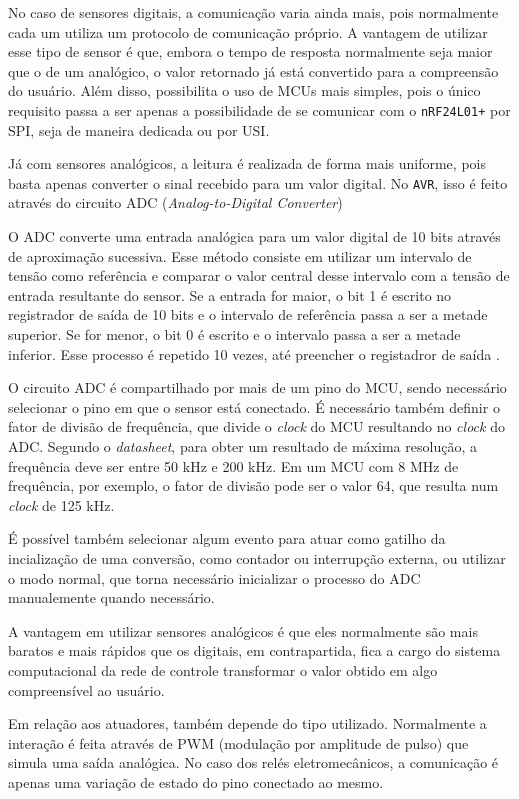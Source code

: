 No caso de sensores digitais, a comunicação varia ainda mais, pois normalmente cada um utiliza um protocolo de
comunicação próprio. A vantagem de utilizar esse tipo de sensor é que, embora o tempo de resposta normalmente
seja maior que o de um analógico, o valor retornado já está convertido para a compreensão do usuário. Além
disso, possibilita o uso de MCUs mais simples, pois o único requisito passa a ser apenas a possibilidade de se
comunicar com o \texttt{nRF24L01+} por SPI, seja de maneira dedicada ou por USI.

Já com sensores analógicos, a leitura é realizada de forma mais uniforme, pois basta apenas converter o sinal
recebido para um valor digital. No \texttt{AVR}, isso é feito através do circuito ADC (\textit{Analog-to-Digital
Converter})

O ADC converte uma entrada analógica para um valor digital de 10 bits através de aproximação sucessiva. Esse
método consiste em utilizar um intervalo de tensão como referência e comparar o valor central desse intervalo
com a tensão de entrada resultante do sensor. Se a entrada for maior, o bit 1 é escrito no registrador de
saída de 10 bits e o intervalo de referência passa a ser a metade superior. Se for menor, o bit 0 é escrito e
o intervalo passa a ser a metade inferior. Esse processo é repetido 10 vezes, até preencher o registadror de
saída \cite{williams2014}.

O circuito ADC é compartilhado por mais de um pino do MCU, sendo necessário selecionar o pino em que o sensor
está conectado. É necessário também definir o fator de divisão de frequência, que divide o \textit{clock} do
MCU resultando no \textit{clock} do ADC. Segundo o \textit{datasheet}, para obter um resultado de máxima
resolução, a frequência deve ser entre 50 kHz e 200 kHz. Em um MCU com 8 MHz de frequência, por exemplo, o
fator de divisão pode ser o valor 64, que resulta num \textit{clock} de 125 kHz.

É possível também selecionar algum evento para atuar como gatilho da incialização de uma conversão, como
contador ou interrupção externa, ou utilizar o modo normal, que torna necessário inicializar o processo do ADC
manualemente quando necessário.

A vantagem em utilizar sensores analógicos é que eles normalmente são mais baratos e mais rápidos que os
digitais, em contrapartida, fica a cargo do sistema computacional da rede de controle transformar o valor
obtido em algo compreensível ao usuário.

Em relação aos atuadores, também depende do tipo utilizado. Normalmente a interação é feita através de PWM
(modulação por amplitude de pulso) que simula uma saída analógica. No caso dos relés eletromecânicos, a
comunicação é apenas uma variação de estado do pino conectado ao mesmo.

